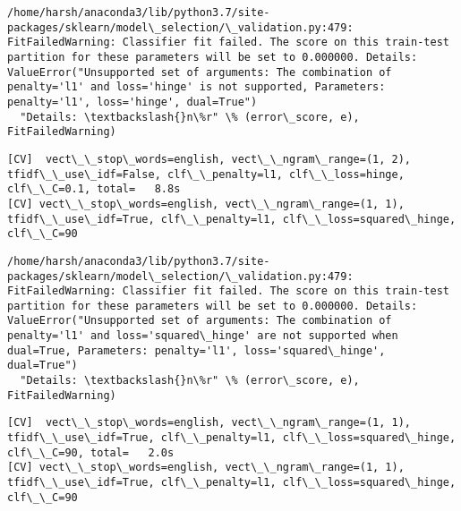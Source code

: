 \documentclass[11pt]{article}
\begin{document}
    \begin{Verbatim}[commandchars=\\\{\}]
/home/harsh/anaconda3/lib/python3.7/site-packages/sklearn/model\_selection/\_validation.py:479: FitFailedWarning: Classifier fit failed. The score on this train-test partition for these parameters will be set to 0.000000. Details: 
ValueError("Unsupported set of arguments: The combination of penalty='l1' and loss='hinge' is not supported, Parameters: penalty='l1', loss='hinge', dual=True")
  "Details: \textbackslash{}n\%r" \% (error\_score, e), FitFailedWarning)

    \end{Verbatim}

    \begin{Verbatim}[commandchars=\\\{\}]
[CV]  vect\_\_stop\_words=english, vect\_\_ngram\_range=(1, 2), tfidf\_\_use\_idf=False, clf\_\_penalty=l1, clf\_\_loss=hinge, clf\_\_C=0.1, total=   8.8s
[CV] vect\_\_stop\_words=english, vect\_\_ngram\_range=(1, 1), tfidf\_\_use\_idf=True, clf\_\_penalty=l1, clf\_\_loss=squared\_hinge, clf\_\_C=90 

    \end{Verbatim}

    \begin{Verbatim}[commandchars=\\\{\}]
/home/harsh/anaconda3/lib/python3.7/site-packages/sklearn/model\_selection/\_validation.py:479: FitFailedWarning: Classifier fit failed. The score on this train-test partition for these parameters will be set to 0.000000. Details: 
ValueError("Unsupported set of arguments: The combination of penalty='l1' and loss='squared\_hinge' are not supported when dual=True, Parameters: penalty='l1', loss='squared\_hinge', dual=True")
  "Details: \textbackslash{}n\%r" \% (error\_score, e), FitFailedWarning)

    \end{Verbatim}

    \begin{Verbatim}[commandchars=\\\{\}]
[CV]  vect\_\_stop\_words=english, vect\_\_ngram\_range=(1, 1), tfidf\_\_use\_idf=True, clf\_\_penalty=l1, clf\_\_loss=squared\_hinge, clf\_\_C=90, total=   2.0s
[CV] vect\_\_stop\_words=english, vect\_\_ngram\_range=(1, 1), tfidf\_\_use\_idf=True, clf\_\_penalty=l1, clf\_\_loss=squared\_hinge, clf\_\_C=90 

    \end{Verbatim}
\end{document}
